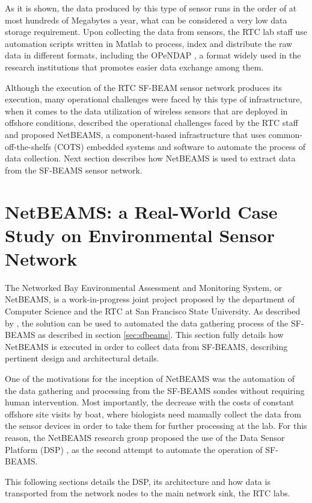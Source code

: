 As it is shown, the data produced by this type of sensor runs in the order of
at most hundreds of Megabytes a year, what can be considered a very low data
storage requirement. Upon collecting the data from sensors, the RTC lab staff
use automation scripts written in Matlab to process, index and distribute the
raw data in different formats, including the OPeNDAP \cite{opendap}, a format
widely used in the research institutions that promotes easier data exchange
among them.

Although the execution of the RTC SF-BEAM sensor network produces its
execution, many operational challenges were faced by this type of
infrastructure, when it comes to the data utilization of wireless sensors that
are deployed in offshore conditions, \cite{netbeams2009} described the
operational challenges faced by the RTC staff and proposed NetBEAMS, a
component-based infrastructure that uses common-off-the-shelfs (COTS) embedded
systems and software to automate the process of data collection. Next section
describes how NetBEAMS is used to extract data from the SF-BEAMS sensor network.

\section{NetBEAMS: a Real-World Case Study on Environmental Sensor Network}

The Networked Bay Environmental Assessment and Monitoring System, or NetBEAMS, 
is a work-in-progress joint project proposed by the department of Computer
Science and the RTC at San Francisco State University. As described by
\cite{netbeams2009}, the solution can be used to automated the data gathering
process of the SF-BEAMS as described in section \ref{sec:sfbeams}. This
section fully details how NetBEAMS is executed in order to collect data from
SF-BEAMS, describing pertinent design and architectural details.

One of the motivations for the inception of NetBEAMS was the automation
of the data gathering and processing from the SF-BEAMS sondes without requiring
human intervention. Most importantly, the decrease with the costs of constant 
offshore site visits by boat, where biologists need manually collect the data
from the sensor devices in order to take them for further processing at the
lab. For this reason, the NetBEAMS research group proposed the use of the Data
Sensor Platform (DSP) \cite{netbeams2009}, as the second attempt to automate
the operation of SF-BEAMS.

This following sections details the DSP, its architecture and how data is
transported from the network nodes to the main network sink, the RTC labs.

